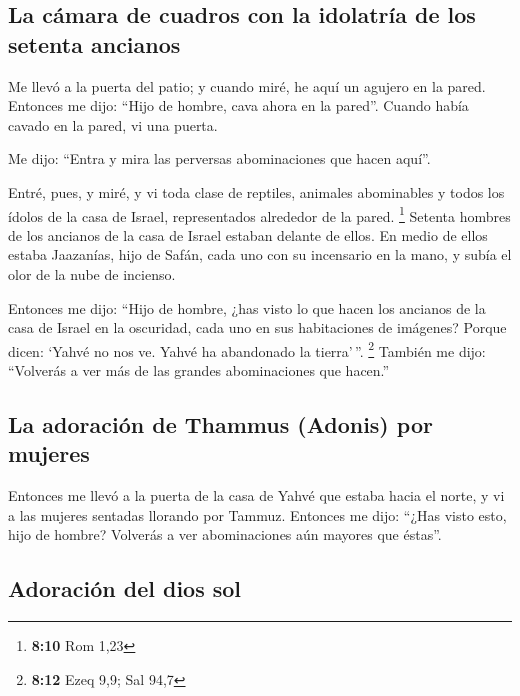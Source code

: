 \hypertarget{la-cuxe1mara-de-cuadros-con-la-idolatruxeda-de-los-setenta-ancianos}{%
\subsection{La cámara de cuadros con la idolatría de los setenta
ancianos}\label{la-cuxe1mara-de-cuadros-con-la-idolatruxeda-de-los-setenta-ancianos}}

 Me llevó a la puerta del patio; y cuando miré, he aquí un
agujero en la pared.  Entonces me dijo: ``Hijo de hombre,
cava ahora en la pared''. Cuando había cavado en la pared, vi una
puerta.

 Me dijo: ``Entra y mira las perversas abominaciones que
hacen aquí''.

 Entré, pues, y miré, y vi toda clase de reptiles,
animales abominables y todos los ídolos de la casa de Israel,
representados alrededor de la pared. \footnote{\textbf{8:10} Rom 1,23}
 Setenta hombres de los ancianos de la casa de Israel
estaban delante de ellos. En medio de ellos estaba Jaazanías, hijo de
Safán, cada uno con su incensario en la mano, y subía el olor de la nube
de incienso.

 Entonces me dijo: ``Hijo de hombre, ¿has visto lo que
hacen los ancianos de la casa de Israel en la oscuridad, cada uno en sus
habitaciones de imágenes? Porque dicen: `Yahvé no nos ve. Yahvé ha
abandonado la tierra'\,''. \footnote{\textbf{8:12} Ezeq 9,9; Sal 94,7}
 También me dijo: ``Volverás a ver más de las grandes
abominaciones que hacen.''

\hypertarget{la-adoraciuxf3n-de-thammus-adonis-por-mujeres}{%
\subsection{La adoración de Thammus (Adonis) por
mujeres}\label{la-adoraciuxf3n-de-thammus-adonis-por-mujeres}}

 Entonces me llevó a la puerta de la casa de Yahvé que
estaba hacia el norte, y vi a las mujeres sentadas llorando por Tammuz.
 Entonces me dijo: ``¿Has visto esto, hijo de hombre?
Volverás a ver abominaciones aún mayores que éstas''.

\hypertarget{adoraciuxf3n-del-dios-sol}{%
\subsection{Adoración del dios sol}\label{adoraciuxf3n-del-dios-sol}}

